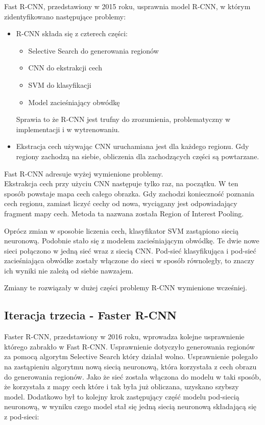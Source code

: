 Fast R-CNN, przedstawiony w 2015 roku, usprawnia model R-CNN, w którym zidentyfikowano następujące problemy:

\begin{itemize}
	\item R-CNN składa się z czterech części:
		\begin{itemize}
			\item Selective Search do generowania regionów
			\item CNN do ekstrakcji cech
			\item SVM do klasyfikacji
			\item Model zacieśniający obwódkę
		\end{itemize}
		Sprawia to że R-CNN jest trufny do zrozumienia, problematyczny w implementacji i w wytrenowaniu.
	\item Ekstracja cech używając CNN uruchamiana jest dla każdego regionu. Gdy regiony zachodzą na siebie, obliczenia dla zachodzących części są powtarzane.
\end{itemize}

Fast R-CNN adresuje wyżej wymienione problemy. \\

Ekstrakcja cech przy użyciu CNN następuje tylko raz, na początku. W ten sposób powstaje mapa cech całego obrazka. Gdy zachodzi konieczność poznania cech regionu, zamiast liczyć cechy od nowa, wyciągany jest odpowiadający fragment mapy cech. Metoda ta nazwana została Region of Interest Pooling.

Oprócz zmian w sposobie liczenia cech, klasyfikator SVM zastąpiono siecią neuronową. Podobnie stało się z modelem zacieśniającym obwódkę. Te dwie nowe sieci połączono w jedną sieć wraz z siecią CNN. Pod-sieć klasyfikująca i pod-sieć zacieśniająca obwódke zostały włączone do sieci w sposób równoległy, to znaczy ich wyniki nie zależą od siebie nawzajem.

Zmiany te rozwiązały w dużej części problemy R-CNN wymienione wcześniej.

\subsection{Iteracja trzecia - Faster R-CNN}

Faster R-CNN, przedstawiony w 2016 roku, wprowadza kolejne usprawnienie którego zabrakło w Fast R-CNN. Usprawnienie dotyczyło generowania regionów za pomocą algorytm Selective Search który działał wolno. Usprawnienie polegało na zastąpieniu algorytmu nową siecią neuronową, która korzystała z cech obrazu do generowania regionów. Jako że sieć została włączona do modelu w taki sposób, że korzystała z mapy cech które i tak była już obliczana, uzyskano szybszy model. Dodatkowo był to kolejny krok zastępujący część modelu pod-siecią neuronową, w wyniku czego model stał się jedną siecią neuronową składającą się z pod-sieci:

